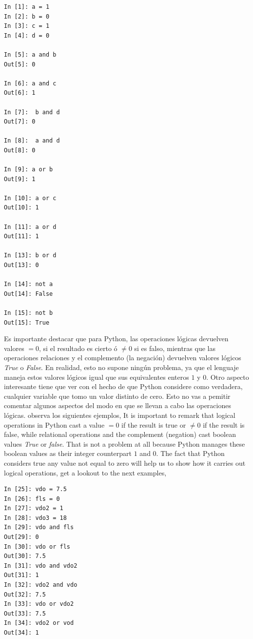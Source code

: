 \begin{center}
\begin{minipage}{.2\textwidth}
\begin{verbatim}
In [1]: a = 1
In [2]: b = 0
In [3]: c = 1
In [4]: d = 0

In [5]: a and b
Out[5]: 0

In [6]: a and c
Out[6]: 1

In [7]:  b and d
Out[7]: 0

In [8]:  a and d
Out[8]: 0

In [9]: a or b
Out[9]: 1

In [10]: a or c
Out[10]: 1

In [11]: a or d
Out[11]: 1

In [13]: b or d
Out[13]: 0

In [14]: not a
Out[14]: False

In [15]: not b
Out[15]: True
\end{verbatim}
\end{minipage}
\end{center}

\begin{paracol}{2}
Es importante destacar que para Python, las operaciones lógicas devuelven valores $=0$, si el resultado es cierto ó $\neq 0$ si es falso, mientras que las operaciones relaciones y el complemento (la negación) devuelven valores lógicos \emph{True} o \emph{False}. En realidad, esto no supone ningún problema, ya que el lenguaje maneja estos valores lógicos igual que sus equivalentes enteros $1$ y $0$. Otro aspecto interesante tiene que ver con el hecho de que Python considere como verdadera, cualquier variable que tomo un valor distinto de cero. Esto no vas a pemitir comentar algunos aspectos del modo en que se llevan a cabo las operaciones lógicas. observa los siguientes ejemplos,
\switchcolumn
It is important to remark that logical operations in Python cast a value $=0$ if the result is true or $\neq 0$ if the result is false, while relational operations and the complement (negation) cast boolean values \emph{True} or \emph{false}. That is not a problem at all because Python manages these boolean values as their integer counterpart $1$ and $0$. The fact that Python considers true any value not equal to zero will help us to show how it carries out logical operations, get a lookout to the next examples,  
\end{paracol}

\begin{center}
    \begin{minipage}{.2\textwidth}
\begin{verbatim}
In [25]: vdo = 7.5
In [26]: fls = 0
In [27]: vdo2 = 1
In [28]: vdo3 = 18
In [29]: vdo and fls
Out[29]: 0
In [30]: vdo or fls
Out[30]: 7.5
In [31]: vdo and vdo2
Out[31]: 1
In [32]: vdo2 and vdo
Out[32]: 7.5
In [33]: vdo or vdo2
Out[33]: 7.5
In [34]: vdo2 or vod
Out[34]: 1
\end{verbatim}
    \end{minipage}
\end{center}

